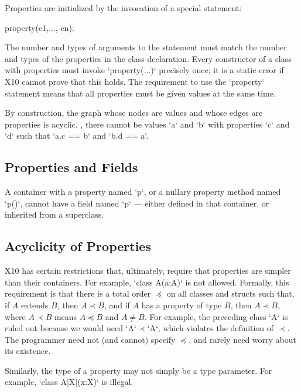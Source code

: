 Properties are initialized by the invocation of a special 
statement: 
\begin{xten}
property(e1,..., en);
\end{xten}
The number and types of arguments to the  statement must match
the number and types of the properties in the class declaration.  
Every constructor of a class with properties must invoke \xcd`property(...)`
precisely once; it is a static error if X10 cannot prove that this holds.
The requirement to use the \xcd`property` statement means that all properties
must be given values at the same time.  

By construction, the graph whose nodes are values and whose edges are
properties is acyclic.  \Eg, there cannot be values \xcd`a` and \xcd`b` with
properties \xcd`c` and \xcd`d` such that \xcd`a.c == b` and \xcd`b.d == a`.


\subsection{Properties and Fields}

A container with a property named \xcd`p`, or a nullary property method named
\xcd`p()`, cannot have a field named \xcd`p` --- either defined in that
container, or inherited from a superclass.

\subsection{Acyclicity of Properties}

X10 has certain restrictions that, ultimately, require that properties are
simpler than their containers.  For example, \xcd`class A(a:A){}` is not
allowed.  
Formally, this requirement is that there is  a total order $\preceq$ 
on all classes and
structs such that, if $A$ extends $B$, then $A \prec B$, and
if $A$ has a property of type $B$, then $A \prec B$, where $A \prec B$ means
$A \preceq B$ and $A \ne B$.   
For example, the preceding class \xcd`A` is ruled out because we would need
\xcd`A`$\prec$\xcd`A`, which violates the definition of $\prec$.
The programmer need not (and cannot) specify
$\preceq$, and rarely need worry about its existence.  

Similarly, 
the type of a property may not simply be a type parameter.  
For example, \xcd`class A[X](x:X){}` is illegal.





